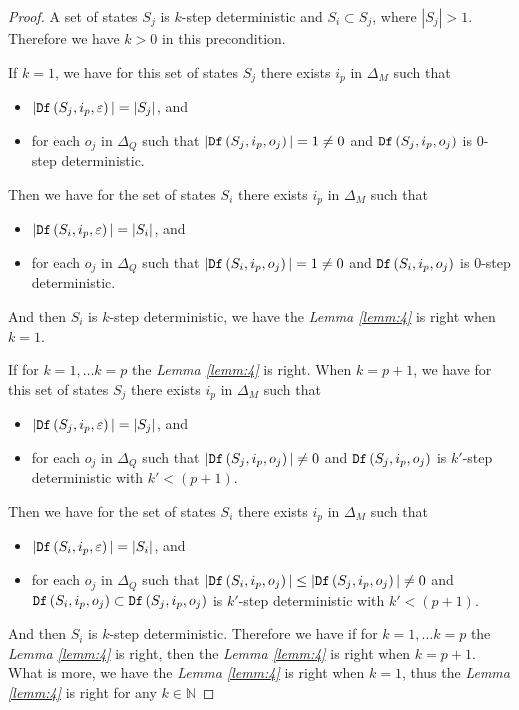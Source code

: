 \begin{proof}
A set of states $S_j$ is $k$-step deterministic and $S_i\subset S_j$, where $|S_j|>1$. Therefore we have $k>0$ in this precondition.

If $k=1$, we have for this set of states $S_j$ there exists $i_p$ in $\Delta_M$ such that
 \begin{itemize}
 \item  $|{\tt Df}\left(S_j,i_p,\varepsilon\right)|=|S_j|$, and 
 \item  for each $o_j$ in $\Delta_Q$ such that $|{\tt Df}\left(S_j,i_p,o_j\right)|=1\neq 0$ and ${\tt Df}\left(S_j,i_p,o_j\right)$ is $0$-step deterministic.
 \end{itemize}
 Then we have for the set of states $S_i$ there exists $i_p$ in $\Delta_M$ such that
 \begin{itemize}
 \item  $|{\tt Df}\left(S_i,i_p,\varepsilon\right)|=|S_i|$, and 
 \item  for each $o_j$ in $\Delta_Q$ such that $|{\tt Df}\left(S_i,i_p,o_j\right)|=1\neq 0$ and ${\tt Df}\left(S_i,i_p,o_j\right)$ is $0$-step deterministic.
 \end{itemize} And then $S_i$ is $k$-step deterministic, we have the {\em Lemma \ref{lemm:4}} is right when $k=1$.
 
 If for $k=1,\ldots k=p$ the {\em Lemma \ref{lemm:4}} is right. When $k=p+1$, we have  for this set of states $S_j$ there exists $i_p$ in $\Delta_M$ such that
 \begin{itemize}
 \item  $|{\tt Df}\left(S_j,i_p,\varepsilon\right)|=|S_j|$, and 
 \item  for each $o_j$ in $\Delta_Q$ such that $|{\tt Df}\left(S_j,i_p,o_j\right)|\neq 0$ and ${\tt Df}\left(S_j,i_p,o_j\right)$ is $k'$-step deterministic with  ${k'}<(p+1)$.
 \end{itemize}
 Then we have for the set of states $S_i$ there exists $i_p$ in $\Delta_M$ such that
 \begin{itemize}
 \item  $|{\tt Df}\left(S_i,i_p,\varepsilon\right)|=|S_i|$, and 
 \item  for each $o_j$ in $\Delta_Q$ such that $|{\tt Df}\left(S_i,i_p,o_j\right)| \le |{\tt Df}\left(S_j,i_p,o_j\right)|\neq 0$ and ${\tt Df}\left(S_i,i_p,o_j\right)\subset {\tt Df}\left(S_j,i_p,o_j\right)$ is  $k'$-step deterministic with  ${k'}<(p+1)$.
 \end{itemize}  And then $S_i$ is $k$-step deterministic. Therefore we have if for $k=1,\ldots k=p$ the {\em Lemma \ref{lemm:4}} is right, then the {\em Lemma \ref{lemm:4}} is right when $k=p+1$. What is more, we have the {\em Lemma \ref{lemm:4}} is right when $k=1$, thus the {\em Lemma \ref{lemm:4}} is right for any $k\in\mathbb{N}$
\end{proof}

